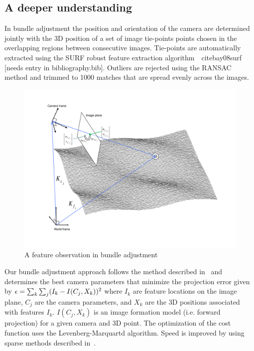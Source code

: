 \subsection{A deeper understanding}

In bundle adjustment the position and orientation of the camera are
determined jointly with the 3D position of a set of image tie-points
points chosen in the overlapping regions between consecutive images.
Tie-points are automatically extracted using the SURF robust feature
extraction algorithm~\ cite{bay08surf} [needs entry in bibliography.bib].  Outliers are rejected using
the RANSAC method and trimmed to 1000 matches that are spread evenly
across the images.

\begin{figure}[htp]
  \begin{center}
  \includegraphics[trim=20mm 20mm 20mm 15mm,clip,width=6in]{images/ba_feature_observation.pdf}
  \end{center}
  \caption{ A feature observation in bundle adjustment \citep{moore09} }
  \label{fig:ba_feature}
\end{figure}

Our bundle adjustment approach follows the method described
in~\cite{Triggs00:bundleadjustment} and determines the best camera
parameters that minimize the projection error given by ${\bf \epsilon}
= \sum_k\sum_j(I_k-I(C_j, X_k))^2$ where $I_k$ are feature locations
on the image plane, $C_j$ are the camera parameters, and $X_k$ are the
3D positions associated with features $I_k$. $I(C_j, X_k)$ is an image
formation model (i.e. forward projection) for a given camera and 3D
point.  The optimization of the cost function uses the
Levenberg-Marquartd algorithm. Speed is improved by using sparse
methods described in~\cite{Hartley00:bundleadjustment}.

